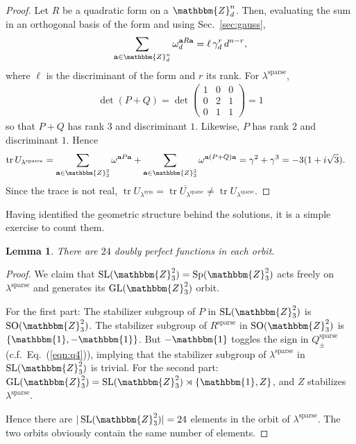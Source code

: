 \documentclass[aps,nofootinbib,floatfix,a4paper]{revtex4}
\newtheorem{lemma}[theorem]{Lemma}
\newcommand{\sym}{^\mathrm{sym}}
\newcommand{\sparse}{^\mathrm{sparse}}
\newcommand{\1}{\mbox{$\mathbf{1}$}}
\def\ZZ{\mathbbm{Z}}
\def\Id{\mathbbm{1}}
\DeclareMathOperator{\Sp}{Sp}
\DeclareMathOperator{\GL}{GL}
\DeclareMathOperator{\SL}{SL}
\DeclareMathOperator{\SO}{SO}
\DeclareMathOperator{\tr}{tr}
\renewcommand{\vec}{\mathbf}
\begin{document}
\begin{proof}
	Let $R$ be a quadratic form on a $\ZZ_d^n$.
	Then, evaluating the sum in an orthogonal basis of the form and using Sec.~\ref{sec:gauss}, 
	\begin{align*}
		\sum_{\vec a\in\ZZ_d^n} \omega_d^{\vec a R \vec a} = 
		\ell\, \gamma_d^r\, d^{n-r},
	\end{align*}
	where $\ell$ is the discriminant of the form and $r$ its rank.
	For $\lambda\sparse$, 
	\begin{align*}
		\det( P+Q)
		=
		\det
		\begin{pmatrix}
			1 & 0 & 0 \\
			0 & 2 & 1 \\
			0 & 1 & 1
		\end{pmatrix}
		=
		1
	\end{align*}
	so that $P+Q$ has rank $3$ and discriminant $1$.
	Likewise, $P$ has rank $2$ and discriminant $1$.
	Hence
	\begin{align*}
		\tr U_{\lambda\sparse} 
		&=
		\sum_{\vec a\in\ZZ_3^2} \omega^{ \vec a P \vec a}
		+
		\sum_{\vec a\in\ZZ_3^3} \omega^{ \vec a(P+Q) \vec a}
		=
		\gamma^2 + \gamma^3 = -3(1+ i \sqrt 3).
	\end{align*}
	Since the trace is not real, 
	$\tr U_{\lambda\sym} = \overline{\tr U_{\lambda\sparse}} \neq \tr U_{\lambda\sparse}$.
\end{proof}

Having identified the geometric structure behind the solutions, it is a simple exercise to count them.

\begin{lemma}
	There are $24$ doubly perfect functions in each orbit.
\end{lemma}

\begin{proof}
	We claim that $\SL(\ZZ_3^2)=\Sp(\ZZ_3^2)$ acts freely on $\lambda\sparse$ and generates its $\GL(\ZZ_3^2)$ orbit.

	For the first part:
	The stabilizer subgroup of $P$ in $\SL(\ZZ_3^2)$ is $\SO(\ZZ_3^2)$.
	The stabilizer subgroup of $R\sparse$ in $\SO(\ZZ_3^2)$ is $\{\Id, -\Id\}$.
	But $-\Id$ toggles the sign in $Q\sparse_\pm$ (c.f.~Eq.~(\ref{eqn:q4})),
	implying that the stabilizer subgroup of $\lambda\sparse$ in $\SL(\ZZ_3^2)$ is trivial.
	For the second part:
	$\GL(\ZZ_3^2)=\SL(\ZZ_3^2) \rtimes \{\Id, Z\}$, and $Z$ stabilizes $\lambda\sparse$.

	Hence there are $|\SL(\ZZ_3^2)|=24$ elements in the orbit of $\lambda\sparse$.
	The two orbits obviously contain the same number of elements.
\end{proof}
\end{document}

